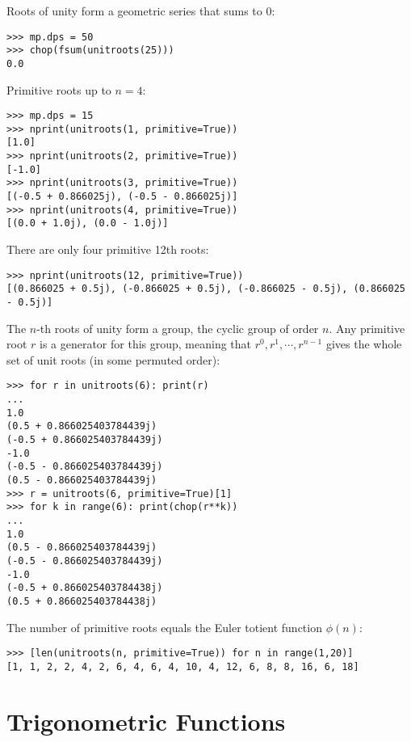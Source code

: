 Roots of unity form a geometric series that sums to 0:
\begin{lstlisting}
>>> mp.dps = 50
>>> chop(fsum(unitroots(25)))
0.0
\end{lstlisting}

Primitive roots up to $n=4$:
\begin{lstlisting}
>>> mp.dps = 15
>>> nprint(unitroots(1, primitive=True))
[1.0]
>>> nprint(unitroots(2, primitive=True))
[-1.0]
>>> nprint(unitroots(3, primitive=True))
[(-0.5 + 0.866025j), (-0.5 - 0.866025j)]
>>> nprint(unitroots(4, primitive=True))
[(0.0 + 1.0j), (0.0 - 1.0j)]
\end{lstlisting}



There are only four primitive 12th roots:

\begin{lstlisting}
>>> nprint(unitroots(12, primitive=True))
[(0.866025 + 0.5j), (-0.866025 + 0.5j), (-0.866025 - 0.5j), (0.866025 - 0.5j)]
\end{lstlisting}

The $n$-th roots of unity form a group, the cyclic group of order $n$. Any primitive root $r$ is a
generator for this group, meaning that $r^0, r^1,\cdots, r^{n-1}$ gives the whole set of unit roots (in some permuted order):

\begin{lstlisting}
>>> for r in unitroots(6): print(r)
...
1.0
(0.5 + 0.866025403784439j)
(-0.5 + 0.866025403784439j)
-1.0
(-0.5 - 0.866025403784439j)
(0.5 - 0.866025403784439j)
>>> r = unitroots(6, primitive=True)[1]
>>> for k in range(6): print(chop(r**k))
...
1.0
(0.5 - 0.866025403784439j)
(-0.5 - 0.866025403784439j)
-1.0
(-0.5 + 0.866025403784438j)
(0.5 + 0.866025403784438j)
\end{lstlisting}



The number of primitive roots equals the Euler totient function $\phi(n)$:
\begin{lstlisting}
>>> [len(unitroots(n, primitive=True)) for n in range(1,20)]
[1, 1, 2, 2, 4, 2, 6, 4, 6, 4, 10, 4, 12, 6, 8, 8, 16, 6, 18]
\end{lstlisting}







\newpage
\section{Trigonometric Functions}
\label{TrigonometricFunctionsCplx}

